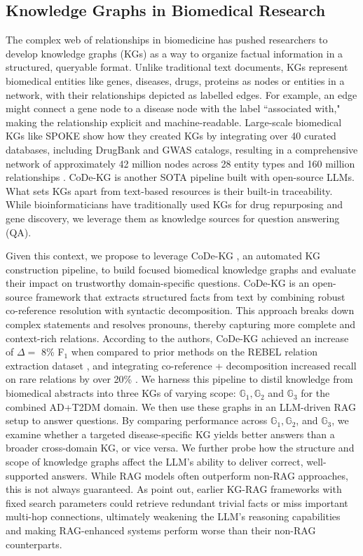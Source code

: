 \subsection{Knowledge Graphs in Biomedical Research}
The complex web of relationships in biomedicine has pushed researchers to develop knowledge graphs (KGs) as a way to organize factual information in a structured, queryable format. Unlike traditional text documents, KGs represent biomedical entities like genes, diseases, drugs, proteins as nodes or entities in a network, with their relationships depicted as labelled edges. For example, an edge might connect a gene node to a disease node with the label ``associated with," making the relationship explicit and machine-readable. Large-scale biomedical KGs like SPOKE show how they created KGs by integrating over 40 curated databases, including DrugBank and GWAS catalogs, resulting in a comprehensive network of approximately 42 million nodes across 28 entity types and 160 million relationships \cite{soman2024biomedical}. CoDe-KG \cite{anuyah2025automated} is another SOTA pipeline built with open-source LLMs. What sets KGs apart from text-based resources is their built-in traceability. While bioinformaticians have traditionally used KGs for drug repurposing and gene discovery, we leverage them as knowledge sources for question answering (QA).

Given this context, we propose to leverage CoDe-KG \cite{anuyah2025automated}, an automated KG construction pipeline, to build focused biomedical knowledge graphs and evaluate their impact on trustworthy domain-specific questions. CoDe-KG is an open-source framework that extracts structured facts from text by combining robust co-reference resolution with syntactic decomposition. This approach breaks down complex statements and resolves pronouns, thereby capturing more complete and context-rich relations. According to the authors, CoDe-KG achieved an increase of $\Delta = $ 8\% F$_1$  when compared to prior methods on the REBEL relation extraction dataset \cite{anuyah2025automated}, and integrating co-reference + decomposition increased recall on rare relations by over 20\% \cite{ anuyah2025automated}. We harness this pipeline to distil knowledge from biomedical abstracts into three KGs of varying scope: $\mathbb{G}_1, \mathbb{G}_2$ and $\mathbb{G}_3$ for the combined AD+T2DM domain. We then use these graphs in an LLM-driven RAG setup to answer questions. By comparing performance across $\mathbb{G}_1, \mathbb{G}_2$, and $\mathbb{G}_3$, we examine whether a targeted disease-specific KG yields better answers than a broader cross-domain KG, or vice versa. We further probe how the structure and scope of knowledge graphs affect the LLM’s ability to deliver correct, well-supported answers. While RAG models often outperform non-RAG approaches, this is not always guaranteed. As \cite{gao2025frag, linders2025knowledge} point out, earlier KG-RAG frameworks with fixed search parameters could retrieve redundant trivial facts or miss important multi-hop connections, ultimately weakening the LLM's reasoning capabilities and making RAG-enhanced systems perform worse than their non-RAG counterparts.
